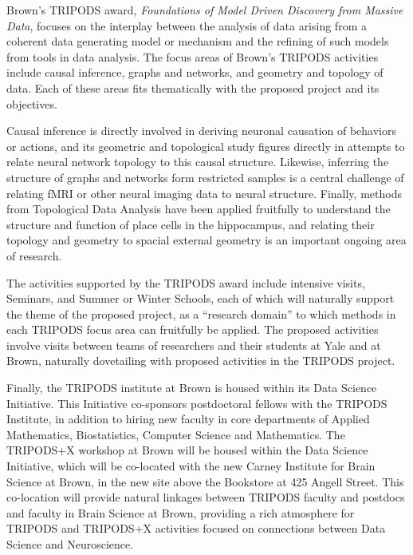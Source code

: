
Brown's TRIPODS award, \emph{Foundations of Model Driven Discovery from Massive Data}, focuses on the interplay between the analysis of data arising from a coherent data generating model or mechanism and the refining of such models from tools in data analysis. The focus areas of Brown's TRIPODS activities include causal inference, graphs and networks, and geometry and topology of data. Each of these areas fits thematically with the proposed project and its objectives.

Causal inference is directly involved in deriving neuronal causation of behaviors or actions, and its geometric and topological study figures directly in attempts to relate neural network topology to this causal structure.
Likewise, inferring the structure of graphs and networks form restricted samples is a central challenge of relating fMRI or other neural imaging data to neural structure. 
Finally, methods from Topological Data Analysis have been applied fruitfully to understand the structure and function of place cells in the hippocampus, and relating their topology and geometry to spacial external geometry is an important ongoing area of research.

The activities supported by the TRIPODS award include intensive visits, Seminars, and Summer or Winter Schools, each of which will naturally support the theme of the proposed project, as a ``research domain'' to which methods in each TRIPODS focus area can fruitfully be applied. The proposed activities involve visits between teams of researchers and their students at Yale and at Brown, naturally dovetailing with proposed activities in the TRIPODS project. 

Finally, the TRIPODS institute at Brown is housed within its Data Science Initiative. This Initiative co-sponsors postdoctoral fellows with the TRIPODS Institute, in addition to hiring new faculty in core departments of Applied Mathematics, Biostatistics, Computer Science and Mathematics. The TRIPODS+X workshop at Brown will be housed within the Data Science Initiative, which will be co-located with the new Carney Institute for Brain Science at Brown, in the new site above the Bookstore at 425 Angell Street. This co-location will provide natural linkages between TRIPODS faculty and postdocs and faculty in Brain Science at Brown, providing a rich atmosphere for TRIPODS and TRIPODS+X activities focused on connections between Data Science and Neuroscience.
